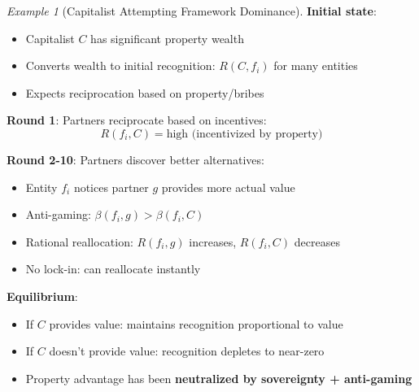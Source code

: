 \documentclass[11pt,a4paper]{article}
\theoremstyle{definition}
\theoremstyle{remark}
\newtheorem{example}[theorem]{Example}
\begin{document}
\begin{example}[Capitalist Attempting Framework Dominance]
\textbf{Initial state}:
\begin{itemize}
\item Capitalist $C$ has significant property wealth
\item Converts wealth to initial recognition: $R(C, f_i)$ for many entities
\item Expects reciprocation based on property/bribes
\end{itemize}

\textbf{Round 1}: Partners reciprocate based on incentives:
\[ R(f_i, C) = \text{high (incentivized by property)} \]

\textbf{Round 2-10}: Partners discover better alternatives:
\begin{itemize}
\item Entity $f_i$ notices partner $g$ provides more actual value
\item Anti-gaming: $\beta(f_i, g) > \beta(f_i, C)$
\item Rational reallocation: $R(f_i, g)$ increases, $R(f_i, C)$ decreases
\item No lock-in: can reallocate instantly
\end{itemize}

\textbf{Equilibrium}: 
\begin{itemize}
\item If $C$ provides value: maintains recognition proportional to value
\item If $C$ doesn't provide value: recognition depletes to near-zero
\item Property advantage has been \textbf{neutralized by sovereignty + anti-gaming}
\end{itemize}
\end{example}
\end{document}
